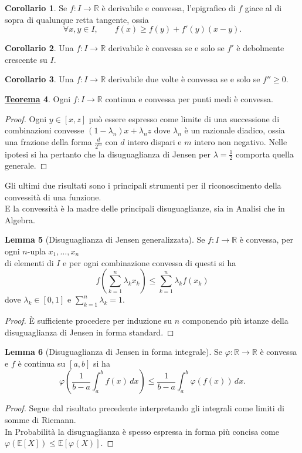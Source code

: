\documentclass[a4paper,twoside]{article}
\newcommand{\R}{\mathbb{R}}
\theoremstyle{definition}
\newtheorem{theorem}{\color{Red}\underline{\textrm Teorema}}
\newtheorem{lemma}[theorem]{Lemma}
\newtheorem{cor}[theorem]{Corollario}
\numberwithin{theorem}{section}
\begin{document}
\begin{cor} Se $f:I\to\R$ è derivabile e convessa, l'epigrafico di $f$ giace al di sopra di qualunque retta tangente, ossia 
$$ \forall x,y\in I,\qquad f(x)\geq f(y) + f'(y)(x-y).$$
\end{cor}

\begin{cor} Una $f:I\to\R$ derivabile è convessa se e solo se $f'$ è debolmente crescente su $I$. 
\end{cor}

\begin{cor} Una $f:I\to\R$ derivabile due volte è convessa se e solo se $f''\geq 0$.\end{cor}

\begin{theorem} Ogni $f:I\to\R$ continua e convessa per punti medi è convessa. 
\end{theorem}
\begin{proof} Ogni $y\in[x,z]$ può essere espresso come limite di una successione di combinazioni convesse $(1-\lambda_n)x+\lambda_n z$ dove $\lambda_n$ è un razionale diadico, ossia una frazione della forma $\frac{d}{2^m}$ con $d$ intero dispari e $m$ intero non negativo. Nelle ipotesi si ha pertanto che la disuguaglianza di Jensen per $\lambda=\frac{1}{2}$ comporta quella generale.
\end{proof}

Gli ultimi due risultati sono i principali strumenti per il riconoscimento della convessità di una funzione.\\
E la convessità è la madre delle principali disuguaglianze, sia in Analisi che in Algebra.

\begin{lemma}[Disuguaglianza di Jensen generalizzata] Se $f:I\to\R$ è convessa, per ogni $n$-upla $x_1,\ldots,x_n$\\ di elementi di $I$ e per ogni combinazione convessa di questi si ha 
$$ f\left(\sum_{k=1}^{n}\lambda_k x_k\right)\leq \sum_{k=1}^{n}\lambda_k f(x_k) $$
dove $\lambda_k\in[0,1]$ e $\sum_{k=1}^{n}\lambda_k = 1$. 
\end{lemma}
\begin{proof}
 È sufficiente procedere per induzione su $n$ componendo più istanze della disuguaglianza di Jensen in forma standard.
\end{proof}

\begin{lemma}[Disuguaglianza di Jensen in forma integrale] Se $\varphi:\R\to\R$ è convessa e $f$ è continua su $[a,b]$ si ha 
$$ \varphi\left(\frac{1}{b-a}\int_{a}^{b}f(x)\,dx\right) \leq \frac{1}{b-a}\int_{a}^{b}\varphi(f(x))\,dx.$$
\end{lemma}
\begin{proof} Segue dal risultato precedente interpretando gli integrali come limiti di somme di Riemann.\\ In Probabilità la disuguaglianza è spesso espressa in forma più concisa come $\varphi(\mathbb{E}[X])\leq \mathbb{E}[\varphi(X)]$. 
\end{proof}
\end{document}

